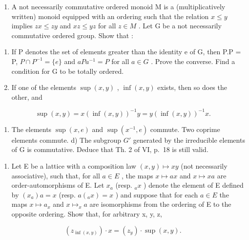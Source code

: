 \BourbakiExerciseGroup

\begin{enumerate}
\def\labelenumi{\arabic{enumi})}
\tightlist
\item
  A not necessarily commutative ordered monoid M is a (multiplicatively written) monoid equipped with an ordering such that the relation \(x \leqslant y\) implies \(zx \leqslant zy\) and \(xz \leqslant yz\) for all \(z \in M\) . Let G be a not necessarily commutative ordered group. Show that :
\end{enumerate}

\begin{enumerate}
\def\labelenumi{\alph{enumi})}
\item
  If P denotes the set of elements greater than the identity e of G, then P.P = P, \(P \cap P^{-1} = \{e\}\) and \(aPa^{-1} = P\) for all \(a \in G\) . Prove the converse. Find a condition for G to be totally ordered.
\item
  If one of the elements \(\sup (x,y)\) , \(\inf (x,y)\) exists, then so does the other, and
\end{enumerate}

\[
\sup (x, y) = x (\inf (x, y)) ^ {- 1} y = y (\inf (x, y)) ^ {- 1} x.
\]

\begin{enumerate}
\def\labelenumi{\alph{enumi})}
\setcounter{enumi}{2}
\tightlist
\item
  The elements \(\sup(x, e)\) and \(\sup(x^{-1}, e)\) commute. Two coprime elements commute. d) The subgroup \(G'\) generated by the irreducible elements of G is commutative. Deduce that Th. 2 of VI, p.~18 is still valid.
\end{enumerate}

\begin{enumerate}
\def\labelenumi{\arabic{enumi})}
\setcounter{enumi}{1}
\tightlist
\item
  Let E be a lattice with a composition law \((x, y) \mapsto xy\) (not necessarily associative), such that, for all \(a \in E\) , the maps \(x \mapsto ax\) and \(x \mapsto xa\) are order-automorphisms of E. Let \(x_{a}\) (resp. \(_{a}x\) ) denote the element of E defined by \((x_{a})a = x\) (resp. \(a(_{a}x) = x\) ) and suppose that for each \(a \in E\) the maps \(x \mapsto a_{x}\) and \(x \mapsto_{x} a\) are isomorphisms from the ordering of E to the opposite ordering. Show that, for arbitrary x, y, z,
\end{enumerate}

\[
\left(z _ {\inf (x, y)}\right) \cdot x = \left(z _ {y}\right) \cdot \sup (x, y).
\]


